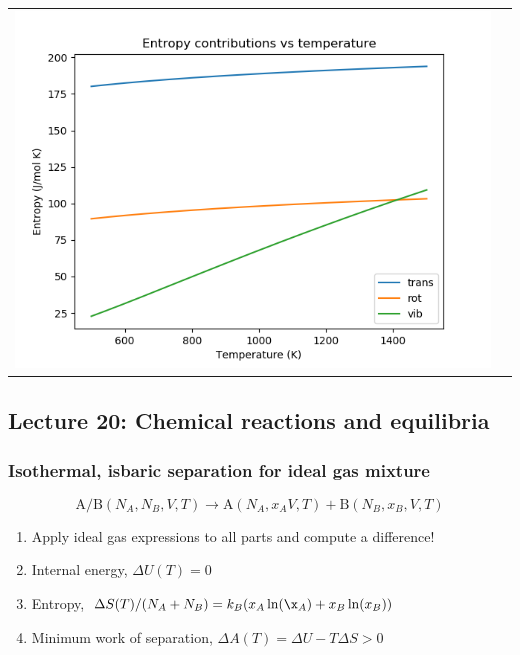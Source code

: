 \documentclass[11pt]{article}
\begin{document}
\begin{table}
\begin{tabular}{cc}
\includegraphics[scale=0.5]{./Images/ethane-entropy.png}
\end{tabular}
\end{table}

\subsection{Lecture 20: Chemical reactions and equilibria}
\label{sec:org776bea3}
\subsubsection{Isothermal, isbaric separation for ideal gas mixture}
\label{sec:orgfdce0cd}
\[ \text{A/B} (N_{A},N_{B},V,T) \rightarrow \text{A}(N_{A},x_{A}V,T) + \text{B}(N_{B},x_{B},V,T) \]
\begin{enumerate}
\item Apply ideal gas expressions to all parts and compute a difference!
\item Internal energy, \(\Delta U(T) = 0\)
\item Entropy, \(\Delta S(T)/(N_A+N_B) = k_B(x_A\ln(\x_A) + x_B \ln(x_B))\)
\item Minimum work of separation, \(\Delta A(T) = \Delta U - T\Delta S > 0\)
\end{enumerate}
\end{document}
